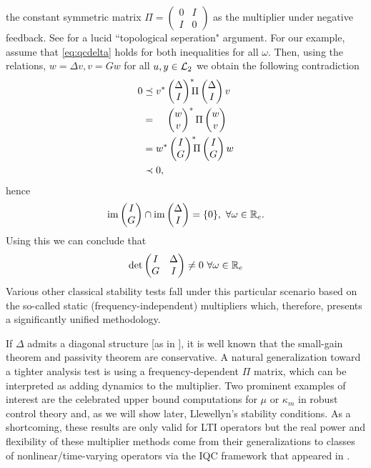 the constant symmetric matrix $\Pi=\left(\begin{smallmatrix}0 &I \\ I &0 \end{smallmatrix} \right)$ as the multiplier 
under negative feedback. See \cite{safonov} for a lucid ``topological seperation" argument. For our example, assume that
\eqref{eq:qcdelta} holds for both inequalities for all $\omega$. Then, using the relations, $w=\Delta v,v=G w$ for all 
$u,y\in\mathcal{L}_2$ we obtain the following contradiction
\begin{align}
0 &\preceq v^*\begin{pmatrix}\Delta\\I\end{pmatrix}^*\!\!\!\Pi\begin{pmatrix}\Delta\\I\end{pmatrix}v\\ &=\phantom{v^*}\begin{pmatrix}w\\v\end{pmatrix}^*\Pi\begin{pmatrix}w\\v\end{pmatrix}\\
&=w^*\begin{pmatrix}I\\G\end{pmatrix}^*\!\!\!\Pi\begin{pmatrix}I\\G\end{pmatrix}w \\&\prec 0, 
\end{align}
hence
\[
\operatorname{im}\begin{pmatrix}I\\G\end{pmatrix} \cap \operatorname{im}\begin{pmatrix}\Delta \\ I\end{pmatrix} =\{0\} ,\ \forall \omega\in\mathbb{R}_e.
\]
Using this we can conclude that 
\[
\det\pmatr{I &\Delta\\G &I}\neq 0\ \forall \omega\in\Realext
\]
Various other classical stability tests fall under this particular {scenario based on the so-called static 
(frequency-independent) multipliers which, therefore, presents} a significantly unified methodology.

If $\Delta$ admits a diagonal structure [as in ], it is well known that the small-gain theorem 
and passivity theorem are conservative. A natural generalization toward a tighter analysis test is using a frequency-dependent 
$\Pi$ matrix, {which can be interpreted as} adding dynamics to the multiplier. Two prominent examples of 
interest are the celebrated upper bound computations for $\mu$ or $\kappa_m$ in robust control theory and, as we will 
show later, Llewellyn's stability conditions. As a shortcoming, these results are only valid for LTI operators but the 
real power and flexibility of these multiplier methods come from {their} generalizations to classes of nonlinear/time-varying 
operators via the IQC framework that appeared in \cite{megretski}.


